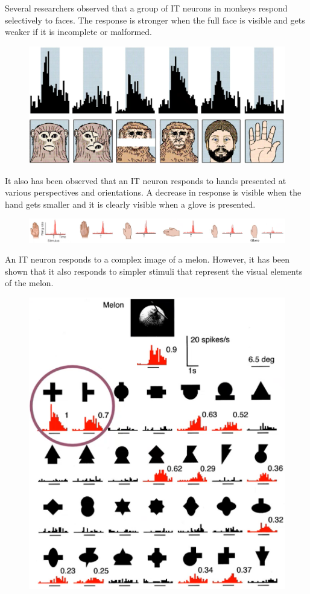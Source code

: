 \begin{casestudy}
    Several researchers observed that a group of IT neurons in monkeys respond selectively to faces.
    The response is stronger when the full face is visible and gets weaker if it is incomplete or malformed.
    \begin{figure}[H]
        \centering
        \includegraphics[width=0.4\linewidth]{./img/monkey_it_faces.png}
    \end{figure}

    It also has been observed that an IT neuron responds to hands presented at various perspectives and orientations.
    A decrease in response is visible when the hand gets smaller and it is clearly visible when a glove is presented.
    \begin{figure}[H]
        \centering
        \includegraphics[width=0.95\linewidth]{./img/monkey_it_hands.png}
    \end{figure}
\end{casestudy}

\begin{casestudy}
    An IT neuron responds to a complex image of a melon.
    However, it has been shown that it also responds to simpler stimuli that represent the visual elements of the melon.

    \begin{figure}[H]
        \centering
        \includegraphics[width=0.4\linewidth]{./img/it_melon.png}
    \end{figure}
\end{casestudy}

